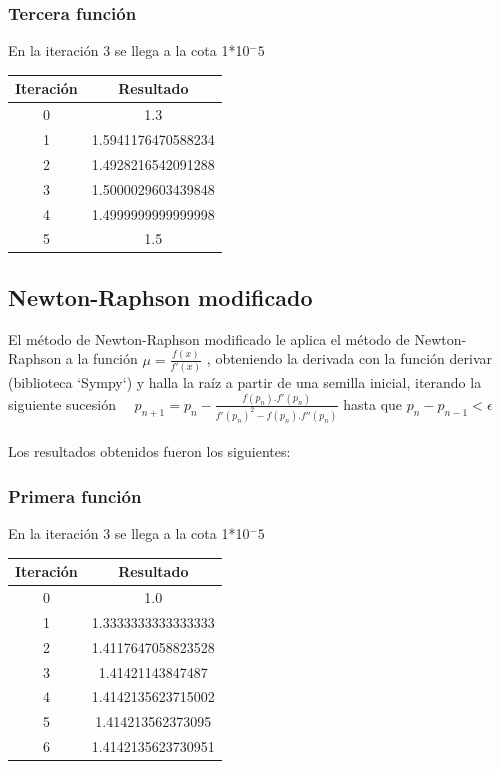 \documentclass[titlepage,a4paper]{article}
\begin{document}
\subsubsection{Tercera función}\label{sec:NR3}
En la iteración 3 se llega a la cota 1*10$^-5$
\begin{center}
    \begin{tabular}{| c | c |}
    \hline
     Iteración & Resultado \\ \hline
   0     &  1.3 \\
1     &  1.5941176470588234 \\
2     &  1.4928216542091288 \\
3     &  1.5000029603439848 \\
4     &  1.4999999999999998 \\
5     &  1.5 \\
    \hline
    \end{tabular}
\end{center}
\subsection{Newton-Raphson modificado}\label{sec:biseccion}

El método de Newton-Raphson modificado le aplica el método de Newton-Raphson a la función $\mu =\frac{f (x)}{f'(x)}$
, obteniendo la derivada con la función derivar (biblioteca `Sympy`) y halla la raíz a partir de una semilla inicial, iterando la siguiente sucesión
$
\quad p_{n+1}=p_n-\frac{f(p_n).f'(p_n)} {f'(p_n)^2-f(p_n).f''(p_n)}
 $ hasta que $
p_{n}-p_{n-1} < \mbox{$\epsilon$}
$
\\\\Los resultados obtenidos fueron los siguientes:
\subsubsection{Primera función}\label{sec:NRM1}
En la iteración 3 se llega a la cota 1*10$^-5$
\begin{center}
    \begin{tabular}{| c | c |}
    \hline
     Iteración & Resultado \\ \hline
   0     &  1.0 \\
1     &  1.3333333333333333 \\
2     &  1.4117647058823528 \\
3     &  1.41421143847487 \\
4     &  1.4142135623715002 \\
5     &  1.414213562373095 \\
6     &  1.4142135623730951 \\
    \hline
    \end{tabular}
\end{center}
\end{document}
